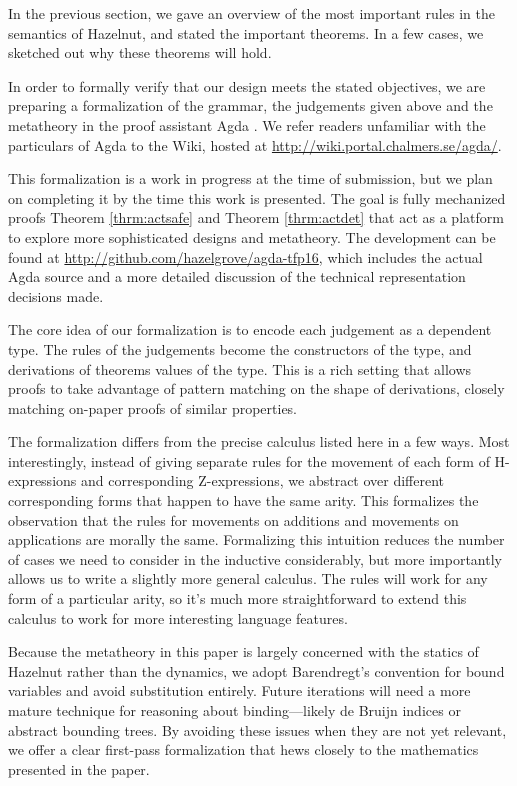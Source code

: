In the previous section, we gave an overview of the most important rules in
the semantics of Hazelnut, and stated the important theorems. In a few
cases, we sketched out why these theorems will hold.

In order to formally verify that our design meets the stated objectives, we
are preparing a formalization of the grammar, the judgements given above
and the metatheory in the proof assistant Agda \cite{norell:thesis}. We
refer readers unfamiliar with the particulars of Agda to the Wiki, hosted
at \url{http://wiki.portal.chalmers.se/agda/}.

This formalization is a work in progress at the time of submission, but we
plan on completing it by the time this work is presented. The goal is fully
mechanized proofs Theorem \ref{thrm:actsafe} and Theorem \ref{thrm:actdet}
that act as a platform to explore more sophisticated designs and
metatheory. The development can be found at
\url{http://github.com/hazelgrove/agda-tfp16}, which includes the actual Agda
source and a more detailed discussion of the technical representation
decisions made.

The core idea of our formalization is to encode each judgement as a
dependent type. The rules of the judgements become the constructors of the
type, and derivations of theorems values of the type. This is a rich
setting that allows proofs to take advantage of pattern matching on the
shape of derivations, closely matching on-paper proofs of similar
properties.

The formalization differs from the precise calculus listed here in a few
ways. Most interestingly, instead of giving separate rules for the movement
of each form of H-expressions and corresponding Z-expressions, we abstract
over different corresponding forms that happen to have the same arity. This
formalizes the observation that the rules for movements on additions and
movements on applications are morally the same. Formalizing this intuition
reduces the number of cases we need to consider in the inductive
considerably, but more importantly allows us to write a slightly more
general calculus. The rules will work for any form of a particular arity,
so it's much more straightforward to extend this calculus to work for more
interesting language features.

Because the metatheory in this paper is largely concerned with the statics
of Hazelnut rather than the dynamics, we adopt Barendregt's convention for
bound variables and avoid substitution entirely.\cite{urban} Future
iterations will need a more mature technique for reasoning about
binding---likely de Bruijn indices or abstract bounding
trees.\cite{lh09unibind} \cite{Pouillard11} By avoiding these issues when
they are not yet relevant, we offer a clear first-pass formalization that
hews closely to the mathematics presented in the paper.
